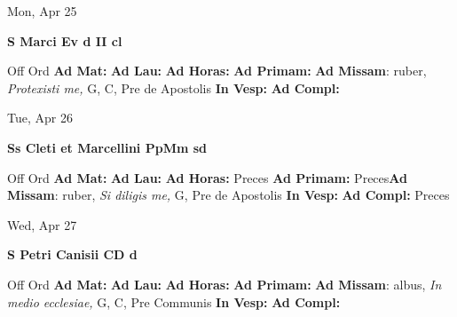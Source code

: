 \documentclass[10pt]{memoir}
\begin{document}
\begin{center}
\begin{minipage}{3.5in}
\vspace{2em}
\begin{center}Mon, Apr 25
\end{center}
\textbf{ \large S Marci Ev
\textnormal{\normalsize d II cl}}

\begin{justify}Off Ord
\textbf{Ad Mat: }
\textbf{Ad Lau: }
\textbf{Ad Horas: }
\textbf{Ad Primam: }\textbf{Ad Missam}: ruber, \textit{Protexisti me,} G, C, Pre de Apostolis
\textbf{In Vesp: }
\textbf{Ad Compl: }
\end{justify}
\end{minipage}
\end{center}

\begin{center}
\begin{minipage}{3.5in}
\vspace{2em}
\begin{center}Tue, Apr 26
\end{center}
\textbf{ \large Ss Cleti et Marcellini PpMm
\textnormal{\normalsize sd}}

\begin{justify}Off Ord
\textbf{Ad Mat: }
\textbf{Ad Lau: }
\textbf{Ad Horas: }Preces
\textbf{Ad Primam: }Preces\textbf{Ad Missam}: ruber, \textit{Si diligis me,} G, Pre de Apostolis
\textbf{In Vesp: }
\textbf{Ad Compl: }Preces
\end{justify}
\end{minipage}
\end{center}

\begin{center}
\begin{minipage}{3.5in}
\vspace{2em}
\begin{center}Wed, Apr 27
\end{center}
\textbf{ \large S Petri Canisii CD
\textnormal{\normalsize d}}

\begin{justify}Off Ord
\textbf{Ad Mat: }
\textbf{Ad Lau: }
\textbf{Ad Horas: }
\textbf{Ad Primam: }\textbf{Ad Missam}: albus, \textit{In medio ecclesiae,} G, C, Pre Communis
\textbf{In Vesp: }
\textbf{Ad Compl: }
\end{justify}
\end{minipage}
\end{center}
\end{document}

